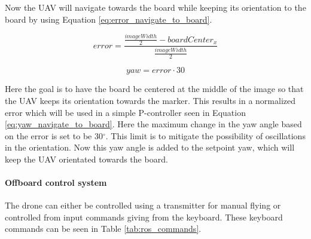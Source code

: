 \documentclass[../Head/report.tex]{subfiles}
\begin{document}
Now the UAV will navigate towards the board while keeping its orientation to the board by using Equation \ref{eq:error_navigate_to_board}. 

\begin{equation}
	error = \frac{\frac{imageWidth}{2} - boardCenter_x}{\frac{imageWidth}{2}}
\label{eq:error_navigate_to_board}
\end{equation}    

\begin{equation}
	yaw = error \cdot 30
\label{eq:yaw_navigate_to_board}
\end{equation} 

Here the goal is to have the board be centered at the middle of the image so that the UAV keeps its orientation towards the marker. This results in a normalized error which will be used in a simple P-controller seen in Equation \ref{eq:yaw_navigate_to_board}. Here the maximum change in the yaw angle based on the error is set to be 30$^{\circ}$. This limit is to mitigate the possibility of oscillations in the orientation. Now this yaw angle is added to the setpoint yaw, which will keep the UAV orientated towards the board.  



\paragraph{Offboard control system} 

The drone can either be controlled using a transmitter for manual flying or controlled from input commands giving from the keyboard. These keyboard commands can be seen in Table \ref{tab:ros_commands}.  
\end{document}
